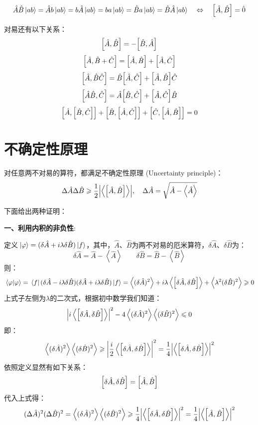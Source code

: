 \[\hat{A}\hat{B}\ket{ab}=\hat{A}b\ket{ab}=b\hat{A}\ket{ab}=ba\ket{ab}=\hat{B}a\ket{ab}=\hat{B}\hat{A}\ket{ab} \quad \Leftrightarrow \quad \comm{\hat{A}}{\hat{B}}=\hat{0}\]

对易还有以下关系：
\[\comm{\hat{A}}{\hat{B}}=-\comm{\hat{B}}{\hat{A}}\]
\[\comm{\hat{A}}{\hat{B}+\hat{C}}=\comm{\hat{A}}{\hat{B}}+\comm{\hat{A}}{\hat{C}}\]
\[\comm{\hat{A}}{\hat{B}\hat{C}}=\hat{B}\comm{\hat{A}}{\hat{C}}+\comm{\hat{A}}{\hat{B}}\hat{C}\]
\[\comm{\hat{A}\hat{B}}{\hat{C}}=\hat{A}\comm{\hat{B}}{\hat{C}}+\comm{\hat{A}}{\hat{C}}\hat{B}\]
\[\comm{\hat{A}}{\comm{\hat{B}}{\hat{C}}}+\comm{\hat{B}}{\comm{\hat{A}}{\hat{C}}}+\comm{\hat{C}}{\comm{\hat{A}}{\hat{B}}}=0\]

\section{不确定性原理}
对任意两不对易的算符，都满足不确定性原理 (Uncertainty principle)：
\[\Delta \hat{A}\Delta \hat{B} \geqslant \frac{1}{2}\qty|\left \langle \comm{\hat{A}}{\hat{B}} \right \rangle|, \quad \Delta\hat{A}=\sqrt{\hat{A}-\left \langle \hat{A} \right \rangle}\]

下面给出两种证明：

\textbf{一、利用内积的非负性}:

定义$\ket*{\varphi}=(\delta\hat{A}+i\lambda \delta\hat{B})\ket*{f}$，其中，$\hat{A}$、$\hat{B}$为两不对易的厄米算符，$\delta\hat{A}$、$\delta\hat{B}$为：
\[\delta\hat{A}=\hat{A}-\left \langle \hat{A} \right \rangle \qquad \delta\hat{B}=\hat{B}-\left \langle \hat{B} \right \rangle\]
则：
\[\bra*{\varphi}\ket*{\varphi}=\bra*{f}(\delta\hat{A}-i\lambda \delta\hat{B})(\delta\hat{A}+i\lambda \delta\hat{B})\ket*{f} = \left \langle (\delta\hat{A})^2 \right \rangle+i\lambda\left \langle \comm{\delta\hat{A}}{\delta\hat{B}} \right \rangle+\left \langle \lambda^2(\delta\hat{B})^2 \right \rangle \geqslant 0\]
上式子左侧为$\lambda$的二次式，根据初中数学我们知道：
\[\left |i\left \langle \comm{\delta\hat{A}}{\delta\hat{B}} \right \rangle\right |^2-4\left \langle (\delta\hat{A})^2 \right \rangle\left \langle (\delta\hat{B})^2 \right \rangle \leqslant 0\]
即：
\[\left \langle (\delta\hat{A})^2 \right \rangle\left \langle (\delta\hat{B})^2 \right \rangle \geqslant \qty|\frac{i}{2}\left \langle \comm{\delta\hat{A}}{\delta\hat{B}} \right \rangle|^2=\frac{1}{4}\qty|\left \langle \comm{\delta\hat{A}}{\delta\hat{B}} \right \rangle|^2\]
依照定义显然有如下关系：
\[\comm{\delta\hat{A}}{\delta\hat{B}}=\comm{\hat{A}}{\hat{B}}\]
代入上式得：
\[(\Delta \hat{A})^2(\Delta \hat{B})^2 = \left \langle (\delta\hat{A})^2 \right \rangle\left \langle (\delta\hat{B})^2 \right \rangle \geqslant \frac{1}{4}\qty|\left \langle \comm{\delta\hat{A}}{\delta\hat{B}} \right \rangle|^2=\frac{1}{4}\qty|\left \langle \comm{\hat{A}}{\hat{B}} \right \rangle|^2\]


